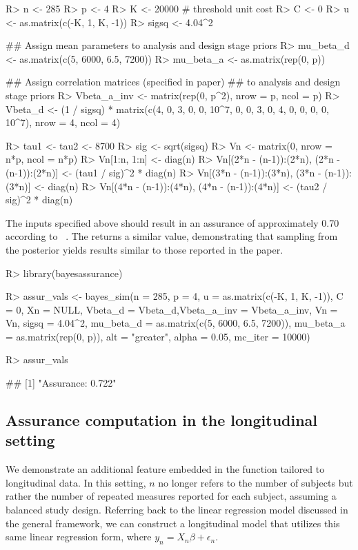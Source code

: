 \begin{Schunk}
\begin{Sin}

R> n <- 285
R> p <- 4
R> K <- 20000 # threshold unit cost
R> C <- 0
R> u <- as.matrix(c(-K, 1, K, -1))
R> sigsq <- 4.04^2

## Assign mean parameters to analysis and design stage priors
R> mu_beta_d <- as.matrix(c(5, 6000, 6.5, 7200))
R> mu_beta_a <- as.matrix(rep(0, p))

## Assign correlation matrices (specified in paper) 
## to analysis and design stage priors
R> Vbeta_a_inv <- matrix(rep(0, p^2), nrow = p, ncol = p)
R> Vbeta_d <- (1 / sigsq) * matrix(c(4, 0, 3, 0, 0, 10^7, 0, 
    0, 3, 0, 4, 0, 0, 0, 0, 10^7), nrow = 4, ncol = 4)

R> tau1 <- tau2 <- 8700
R> sig <- sqrt(sigsq)
R> Vn <- matrix(0, nrow = n*p, ncol = n*p)
R> Vn[1:n, 1:n] <- diag(n)
R> Vn[(2*n - (n-1)):(2*n), (2*n - (n-1)):(2*n)] <- (tau1 / sig)^2 * diag(n)
R> Vn[(3*n - (n-1)):(3*n), (3*n - (n-1)):(3*n)] <- diag(n)
R> Vn[(4*n - (n-1)):(4*n), (4*n - (n-1)):(4*n)] <- (tau2 / sig)^2 * diag(n)

\end{Sin}
\end{Schunk}

The inputs specified above should result in 
an assurance of approximately 0.70 according to
~\cite{ohagan}. The 
returns a similar value, demonstrating
that sampling from the posterior yields results similar to those reported in the paper. 

\begin{Schunk}
\begin{Sin}

R> library(bayesassurance)

R> assur_vals <- bayes_sim(n = 285, p = 4,  u = as.matrix(c(-K, 1, K, -1)), 
   C = 0, Xn = NULL, Vbeta_d = Vbeta_d,Vbeta_a_inv = Vbeta_a_inv, 
   Vn = Vn, sigsq = 4.04^2, mu_beta_d = as.matrix(c(5, 6000, 6.5, 7200)), 
   mu_beta_a = as.matrix(rep(0, p)),  alt = "greater", alpha = 0.05, mc_iter = 10000)
   
R> assur_vals

\end{Sin}
\begin{Sout}
## [1] "Assurance: 0.722"
\end{Sout}
\end{Schunk}




\subsection{Assurance computation in the longitudinal setting}
\label{sec:assur_longitudinal}
We demonstrate an additional feature embedded in the function tailored to longitudinal data.  In this setting, $n$ no longer refers to the number of subjects but rather the number of repeated measures reported for each subject, assuming a balanced study design.  Referring back to the linear regression model discussed in the general framework,  we can construct a longitudinal model that utilizes this same linear regression form, where $y_n = X_n\beta + \epsilon_n$.

